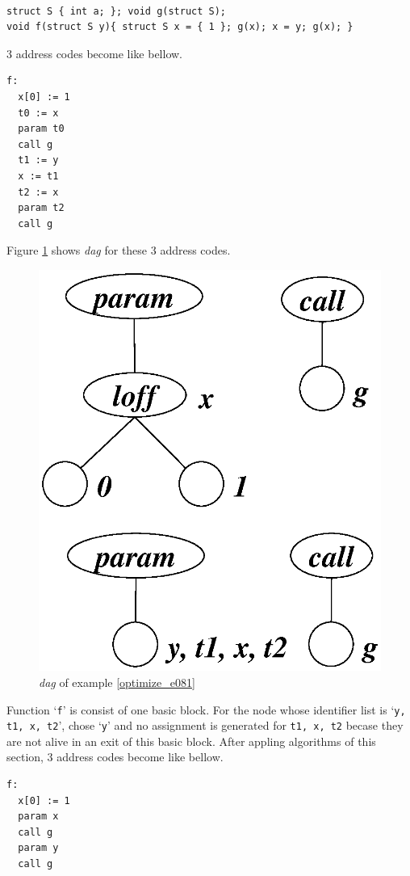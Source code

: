 \begin{Example}
\label{optimize_e081}
\begin{verbatim}

struct S { int a; }; void g(struct S);
void f(struct S y){ struct S x = { 1 }; g(x); x = y; g(x); }
\end{verbatim}
3 address codes become like bellow.
\begin{verbatim}
f:
  x[0] := 1
  t0 := x
  param t0
  call g
  t1 := y
  x := t1
  t2 := x
  param t2
  call g
\end{verbatim}
Figure \ref{optimize_e082} shows {\em dag} for these 3 address codes.
\begin{figure}[htbp]
\begin{center}
\includegraphics[width=0.493\linewidth,height=0.6\linewidth]{opt034.eps}
\caption{{\em dag} of example \ref{optimize_e081}}
\label{optimize_e082}
\end{center}
\end{figure}
Function `{\tt{f}}' is consist of one basic block.
For the node whose identifier list is `{\tt{y, t1, x, t2}}',
chose `{\tt{y}}' and no assignment is generated for
{\tt{t1, x, t2}} becase they are not alive in an exit
of this basic block.
After appling algorithms of this section,
3 address codes become like bellow.
\begin{verbatim}
f:
  x[0] := 1
  param x
  call g
  param y
  call g
\end{verbatim}
\end{Example}


